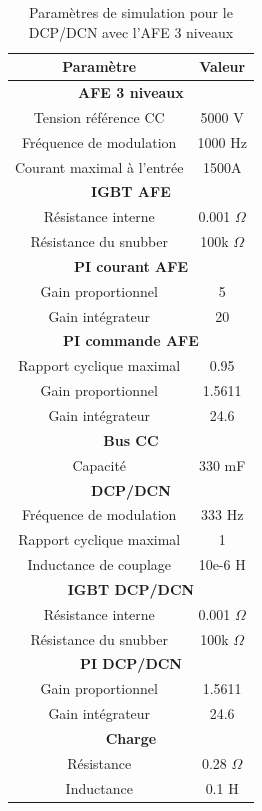 \documentclass[11pt,letterpaper,final]{report}
\begin{document}
\begin{table}[htb]
\centering
\begin{tabular}{|c|c|} 
  \hline
  \textbf{Paramètre} & \textbf{Valeur}  \\
  \hline\hline \hline
  \multicolumn{2}{|c|}{\textbf{AFE 3 niveaux}}\\ \hline \hline 
  Tension référence CC & 5000 V\\ \hline
  Fréquence de modulation & 1000 Hz \\ \hline
  Courant maximal à l'entrée& 1500A \\ \hline \hline
  \multicolumn{2}{|c|}{\textbf{IGBT AFE}}\\ \hline
  Résistance interne & 0.001 $\Omega$\\
  Résistance du snubber & 100k $\Omega$\\ \hline \hline
   \multicolumn{2}{|c|}{\textbf{PI courant AFE}}\\ \hline
  Gain proportionnel & 5 \\
  Gain intégrateur & 20 \\ \hline \hline
  \multicolumn{2}{|c|}{\textbf{PI commande AFE}}\\ \hline
  Rapport cyclique maximal & 0.95\\
  Gain proportionnel & 1.5611 \\
  Gain intégrateur & 24.6 \\ \hline \hline
  \multicolumn{2}{|c|}{\textbf{Bus CC}}\\ \hline
  Capacité & 330 mF\\
  \hline \hline \hline
  
  \multicolumn{2}{|c|}{\textbf{DCP/DCN}}\\ \hline \hline
  Fréquence de modulation & 333 Hz\\ \hline
  Rapport cyclique maximal & 1 \\ \hline
  Inductance de couplage & 10e-6 H \\ \hline \hline
  \multicolumn{2}{|c|}{\textbf{IGBT DCP/DCN}}\\ \hline
  Résistance interne & 0.001 $\Omega$\\
  Résistance du snubber & 100k $\Omega$\\ \hline \hline
   \multicolumn{2}{|c|}{\textbf{PI DCP/DCN}}\\ \hline
  Gain proportionnel & 1.5611 \\
  Gain intégrateur & 24.6 \\ \hline \hline
  \multicolumn{2}{|c|}{\textbf{Charge}}\\ \hline
  Résistance & 0.28 $\Omega$\\
  Inductance & 0.1 H \\
  \hline
\end{tabular}
\caption{Paramètres de simulation pour le DCP/DCN avec l'AFE 3 niveaux}
\label{p_AF_DCP}
\end{table}
\end{document}
